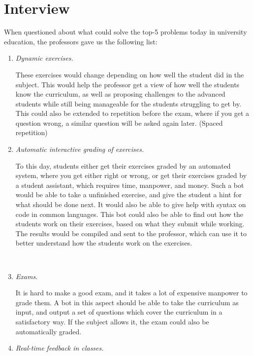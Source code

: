 \documentclass[pdftex, 12pt, norsk, a4paper, twoside]{article}
\numberwithin{equation}{section}
\numberwithin{figure}{section}
\numberwithin{table}{section}
\begin{document}
\section{Interview}
When questioned about what could solve the top-5 problems today in university education, the professors gave us the following list:
\begin{enumerate} %

\item \textit{Dynamic exercises. }

These exercises would change depending on how well the student did in the subject. This would help the professor get a view of how well the students know the curriculum, as well as proposing challenges to the advanced students while still being manageable for the students struggling to get by. This could also be extended to repetition before the exam, where if you get a question wrong, a similar question will be asked again later. (Spaced repetition)

\item \textit{Automatic interactive grading of exercises. }

To this day, students either get their exercises graded by an automated system, where you get either right or wrong, or get their exercises graded by a student assistant, which requires time, manpower, and money. Such a bot would be able to take a unfinished exercise, and give the student a hint for what should be done next. It would also be able to give help with syntax on code in common languages. This bot could also be able to find out how the students work on their exercises, based on what they submit while working. The results would be compiled and sent to the professor, which can use it to better understand how the students work on the exercises.

\newpage

\hfill\\ %
\item \textit{Exams.}

It is hard to make a good exam, and it takes a lot of expensive manpower to grade them. A bot in this aspect should be able to take the curriculum as input, and output a set of questions which cover the curriculum in a satisfactory way. If the subject allows it, the exam could also be automatically graded.

\item \textit{Real-time feedback in classes. }


\end{enumerate}
\end{document}
